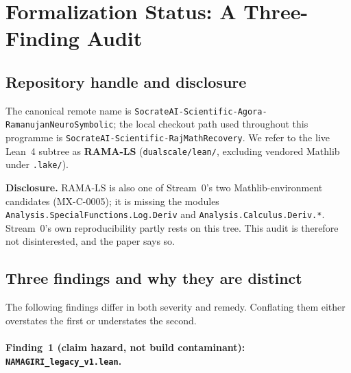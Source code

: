 
\section{Formalization Status: A Three-Finding Audit}
\label{sec:lean}

\subsection*{Repository handle and disclosure}

The canonical remote name is
\texttt{SocrateAI-Scientific-Agora-Ra\-ma\-nu\-jan\-Neuro\-Symbolic};
the local checkout path used throughout this programme is
\texttt{SocrateAI-Scientific-RajMathRecovery}.
We refer to the live Lean~4 subtree as \textbf{RAMA-LS}
(\texttt{dualscale/lean/}, excluding vendored Mathlib under \texttt{.lake/}).

\noindent
\textbf{Disclosure.}
RAMA-LS is also one of Stream~0's two Mathlib-environment candidates
(MX-C-0005); it is missing the modules
\texttt{Analysis.SpecialFunctions.Log.Deriv} and
\texttt{Analysis.Calculus.Deriv.*}.
Stream~0's own reproducibility partly rests on this tree.
This audit is therefore not disinterested, and the paper says so.

\subsection*{Three findings and why they are distinct}

The following findings differ in both severity and remedy.
Conflating them either overstates the first or understates the second.

\paragraph{Finding~1 (claim hazard, not build contaminant):
\texttt{NAMAGIRI\_legacy\_v1.lean}.}

